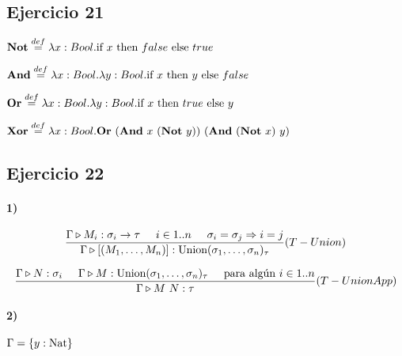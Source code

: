 \documentclass[10pt,a4paper, landscape]{article}
\begin{document}
\subsection{Ejercicio 21}
\begin{multicols}{2}
$\textbf{Not} \overset{def}{=} \lambda x: Bool \text{.} \text{if } x \text{ then } false \text{ else } true$

\vspace*{5mm}
$\textbf{And} \overset{def}{=} \lambda x: Bool \text{.} \lambda y: Bool \text{.} \text{if } x \text{ then } y \text{ else } false$

\vfill

$\textbf{Or} \overset{def}{=} \lambda x: Bool \text{.} \lambda y: Bool \text{.} \text{if } x \text{ then } true \text{ else } y$

\vspace*{5mm}
$\textbf{Xor} \overset{def}{=} \lambda x: Bool \text{.} \textbf{Or}~(\textbf{And}~x~(\textbf{Not}~y))~(\textbf{And}~(\textbf{Not}~x)~y)$
\end{multicols}

\subsection*{Ejercicio 22}
\paragraph{1)}

\begin{multicols}{2}
$$\frac{\Gamma\triangleright M_i : \sigma_i\to\tau\hspace*{5mm}i\in1..n\hspace*{5mm}\sigma_i=\sigma_j\Rightarrow i =j }{\Gamma\triangleright [(M_1,\dots,M_n)] : \text{Union}(\sigma_1,\dots,\sigma_n)_\tau}(T-Union)$$

\vspace*{5mm}
$$\frac{\Gamma\triangleright N : \sigma_i\hspace*{5mm}\Gamma\triangleright M : \text{Union}(\sigma_1,\dots,\sigma_n)_\tau\hspace*{5mm}\text{para algún }  i\in1..n }{\Gamma\triangleright M~N : \tau}(T-UnionApp)$$
\end{multicols}

\newpage
\paragraph{2)} $\Gamma = \{y:\text{Nat}\}$
\end{document}
